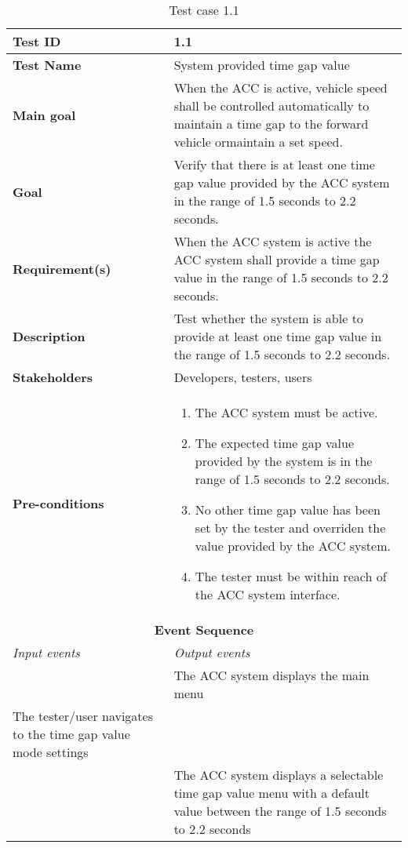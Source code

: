 \begin{table}[H]
\centering
\begin{tabularx}{\linewidth}{ X|X }
  \hline
  \textbf{Test ID} & 1.1 \\
  \hline
  \textbf{Test Name} & System provided time gap value \\
  \hline
  \textbf{Main goal} & When the ACC is active, vehicle speed shall be controlled automatically  to  maintain  a  time  gap  to  the  forward  vehicle  ormaintain a set speed. \\
  \hline
  \textbf{Goal} &  Verify that there is at least one time gap value provided by the ACC system in the range of 1.5 seconds to 2.2 seconds. \\
  \hline
  \textbf{Requirement(s)} &  When the ACC system is active the ACC system shall provide a time gap value in the range of 1.5 seconds to 2.2 seconds. \\
  \hline
  \textbf{Description} &  Test whether the system is able to provide at least one time gap value in the range of 1.5 seconds to 2.2 seconds. \\
  \hline
  \textbf{Stakeholders} &  Developers, testers, users\\
  \hline
  \textbf{Pre-conditions} &
  \begin{enumerate}
      \item The ACC system must be active.
      \item The expected time gap value provided by the system is in the range of 1.5 seconds to 2.2 seconds. 
      \item No other time gap value has been set by the tester and overriden the value provided by the ACC system.
      \item The tester must be within reach of the ACC system interface. 
  \end{enumerate} \\
  \hline
  \multicolumn{2}{c}{\textbf{Event Sequence}}\\
  \hline
  \textit{Input events} & \textit{Output events} \\
  \hline
    & The ACC system displays the main menu \\
  \hline
  The tester/user navigates to the time gap value mode settings  &  \\
  \hline
    &  The ACC system displays a selectable time gap value menu with a default value between the range of 1.5 seconds to 2.2 seconds \\
  \hline
  \end{tabularx}
\caption{\label{tab_case1} Test case 1.1}
\end{table}

